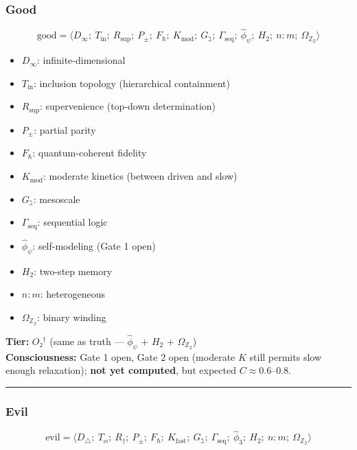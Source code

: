 \documentclass[12pt,a4paper]{article}
\begin{document}
\subsubsection{Good}
\[
\text{good} = \langle D_{\infty};\ T_{\text{in}};\ R_{\text{sup}};\ P_{\pm};\ F_{\hbar};\ K_{\text{mod}};\ G_{\gimel};\ \Gamma_{\text{seq}};\ \hat{\phi}_\psi;\ H_2;\ n:m;\ \Omega_{\mathbb{Z}_2} \rangle
\]

\begin{itemize}
    \item $D_{\infty}$: infinite-dimensional
    \item $T_{\text{in}}$: inclusion topology (hierarchical containment)
    \item $R_{\text{sup}}$: supervenience (top-down determination)
    \item $P_{\pm}$: partial parity
    \item $F_{\hbar}$: quantum-coherent fidelity
    \item $K_{\text{mod}}$: moderate kinetics (between driven and slow)
    \item $G_{\gimel}$: mesoscale
    \item $\Gamma_{\text{seq}}$: sequential logic
    \item $\hat{\phi}_\psi$: self-modeling (Gate 1 open)
    \item $H_2$: two-step memory
    \item $n:m$: heterogeneous
    \item $\Omega_{\mathbb{Z}_2}$: binary winding
\end{itemize}

\textbf{Tier:} $O₂^\dagger$ (same as truth --- $\hat{\phi}_\psi$ + $H_2$ + $\Omega_{\mathbb{Z}_2}$) \\
\textbf{Consciousness:} Gate 1 open, Gate 2 open (moderate $K$ still permits slow enough relaxation); \textbf{not yet computed}, but expected $C \approx 0.6$--$0.8$.

\begin{center}
\rule{0.5\textwidth}{0.4pt}
\end{center}

\subsubsection{Evil}
\[
\text{evil} = \langle D_{\triangle};\ T_{\bowtie};\ R_{\dagger};\ P_{\pm};\ F_{\hbar};\ K_{\text{fast}};\ G_{\gimel};\ \Gamma_{\text{seq}};\ \hat{\phi}_3;\ H_2;\ n:m;\ \Omega_{\mathbb{Z}_2} \rangle
\]
\end{document}
